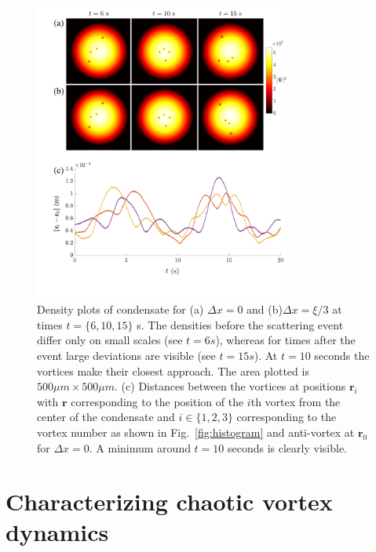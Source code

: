 \begin{figure}
\center \includegraphics[width=0.75\textwidth]{data/2d/snapshots/snapshots}

\caption{
Density plots of condensate for (a) $\Delta x = 0$ and (b)$\Delta x=\xi/3$ at times $t=\{6,10,15\}$ s. The densities before the scattering event differ only on small scales (see $t=6s$), whereas for times after the event large deviations are visible (see $t=15s$).
At $t=10$ seconds the vortices make their closest approach. The area plotted is $500 \mu m\times 500 \mu m$.
(c) Distances between the vortices at positions $\mathbf{r}_i$ with $\mathbf{r}$ corresponding to the position of the $i$th vortex from the center of the condensate and $i\in \{1,2,3\}$ corresponding to the vortex number as shown in Fig.~\ref{fig:histogram} and anti-vortex at $\mathbf{r}_0$ for $\Delta x = 0$.
A minimum around $t=10$ seconds is clearly visible.
}
\label{fig:snapshots}
\end{figure}

\section{Characterizing chaotic vortex dynamics}

